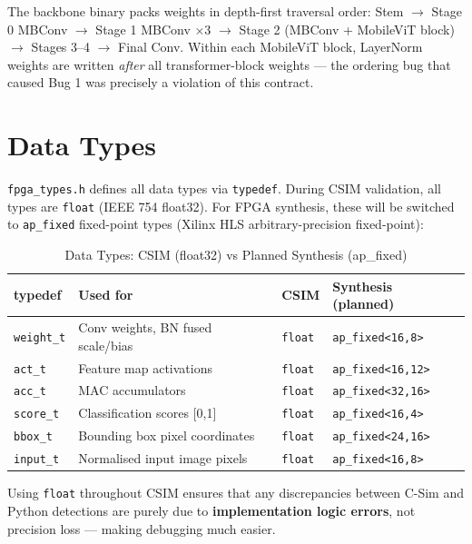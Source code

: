 The backbone binary packs weights in depth-first traversal order: Stem $\rightarrow$ Stage 0 MBConv $\rightarrow$ Stage 1 MBConv $\times$3 $\rightarrow$ Stage 2 (MBConv + MobileViT block) $\rightarrow$ Stages 3--4 $\rightarrow$ Final Conv. Within each MobileViT block, LayerNorm weights are written \textit{after} all transformer-block weights — the ordering bug that caused Bug 1 was precisely a violation of this contract.

\section{Data Types}

\texttt{fpga\_types.h} defines all data types via \texttt{typedef}. During CSIM validation, all types are \texttt{float} (IEEE 754 float32). For FPGA synthesis, these will be switched to \texttt{ap\_fixed} fixed-point types (Xilinx HLS arbitrary-precision fixed-point):

\begin{table}[H]
\centering
\caption{Data Types: CSIM (float32) vs Planned Synthesis (ap\_fixed)}
\begin{tabular}{|l|l|l|l|}
\hline
\textbf{typedef} & \textbf{Used for} & \textbf{CSIM} & \textbf{Synthesis (planned)} \\
\hline
\texttt{weight\_t} & Conv weights, BN fused scale/bias  & \texttt{float} & \texttt{ap\_fixed<16,8>} \\
\texttt{act\_t}    & Feature map activations             & \texttt{float} & \texttt{ap\_fixed<16,12>} \\
\texttt{acc\_t}    & MAC accumulators                    & \texttt{float} & \texttt{ap\_fixed<32,16>} \\
\texttt{score\_t}  & Classification scores [0,1]         & \texttt{float} & \texttt{ap\_fixed<16,4>} \\
\texttt{bbox\_t}   & Bounding box pixel coordinates      & \texttt{float} & \texttt{ap\_fixed<24,16>} \\
\texttt{input\_t}  & Normalised input image pixels       & \texttt{float} & \texttt{ap\_fixed<16,8>} \\
\hline
\end{tabular}
\label{table:data_types}
\end{table}

Using \texttt{float} throughout CSIM ensures that any discrepancies between C-Sim and Python detections are purely due to \textbf{implementation logic errors}, not precision loss — making debugging much easier.

